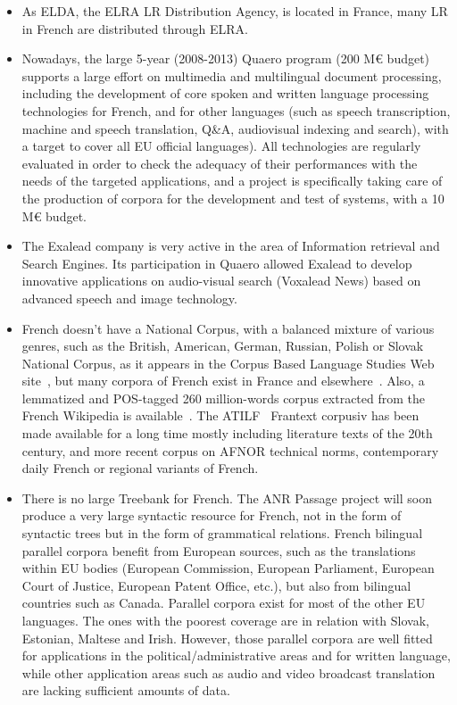 \begin{multicols}{2}
\begin{itemize}
\item As ELDA, the ELRA LR Distribution Agency, is located in France, many
LR in French are distributed through ELRA.

\item Nowadays, the large 5-year (2008-2013) Quaero program (200 M€
  budget) supports a large effort on multimedia and multilingual
  document processing, including the development of core spoken and
  written language processing technologies for French, and for other
  languages (such as speech transcription, machine and speech
  translation, Q\&A, audiovisual indexing and search), with a target
  to cover all EU official languages). All technologies are regularly
  evaluated in order to check the adequacy of their performances with
  the needs of the targeted applications, and a project is
  specifically taking care of the production of corpora for the
  development and test of systems, with a 10 M€ budget.

\item The Exalead company is very active in the area of Information
retrieval and Search Engines. Its participation in Quaero allowed
Exalead to develop innovative applications on audio-visual search
(Voxalead News) based on advanced speech and image technology.

\item French doesn’t have a National Corpus, with a balanced mixture of
various genres, such as the British, American, German, Russian, Polish
or Slovak National Corpus, as it appears in the Corpus Based Language
Studies Web site~\cite{corpuslangstud}, but many corpora of French exist in France and
elsewhere~\cite{corpusfr}. Also, a lemmatized and POS-tagged 260 million-words
corpus extracted from the French Wikipedia is available~\cite{wikipediafr}. The ATILF~\cite{atilf}
Frantext corpusiv has been made available for a long time mostly
including literature texts of the 20th century, and more recent corpus
on AFNOR technical norms, contemporary daily French or regional
variants of French.

\item There is no large Treebank for French. The ANR Passage project will
soon produce a very large syntactic resource for French, not in the
form of syntactic trees but in the form of grammatical relations.
French bilingual parallel corpora benefit from European sources, such
as the translations within EU bodies (European Commission, European
Parliament, European Court of Justice, European Patent Office, etc.),
but also from bilingual countries such as Canada. Parallel corpora
exist for most of the other EU languages. The ones with the poorest
coverage are in relation with Slovak, Estonian, Maltese and
Irish. However, those parallel corpora are well fitted for
applications in the political/administrative areas and for written
language, while other application areas such as audio and video
broadcast translation are lacking sufficient amounts of data.


\end{itemize}
\end{multicols}

